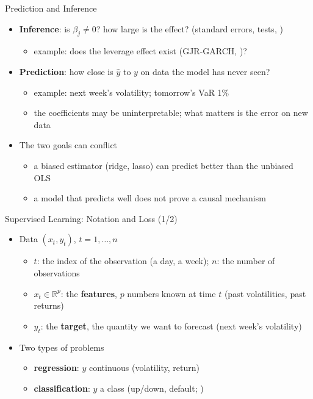 \begin{frame}{Prediction and Inference}
\itemsize{\small}
\begin{itemize}
    \item \textbf{Inference}: is $\beta_j \ne 0$? how large is the effect? (standard errors, tests, )
    \begin{itemize}
        \item example: does the leverage effect exist (GJR-GARCH, )?
    \end{itemize}
    \item \textbf{Prediction}: how close is $\hat y$ to $y$ on data the model has never seen?
    \begin{itemize}
        \item example: next week's volatility; tomorrow's VaR 1\%
        \item the coefficients may be uninterpretable; what matters is the error on new data
    \end{itemize}
    \item The two goals can conflict
    \begin{itemize}
        \item a biased estimator (ridge, lasso) can predict better than the unbiased OLS
        \item a model that predicts well does not prove a causal mechanism
    \end{itemize}
\end{itemize}
\end{frame}

\begin{frame}{Supervised Learning: Notation and Loss (1/2)}
\itemsize{\small}
\begin{itemize}
    \item Data $(x_t, y_t)$, $t = 1, \dots, n$
    \begin{itemize}
        \item $t$: the index of the observation (a day, a week); $n$: the number of observations
        \item $x_t \in \mathbb{R}^p$: the \textbf{features}, $p$ numbers known at time $t$ (past volatilities, past returns)
        \item $y_t$: the \textbf{target}, the quantity we want to forecast (next week's volatility)
    \end{itemize}
    \item Two types of problems
    \begin{itemize}
        \item \textbf{regression}: $y$ continuous (volatility, return)
        \item \textbf{classification}: $y$ a class (up/down, default; )
    \end{itemize}
\end{itemize}
\end{frame}

